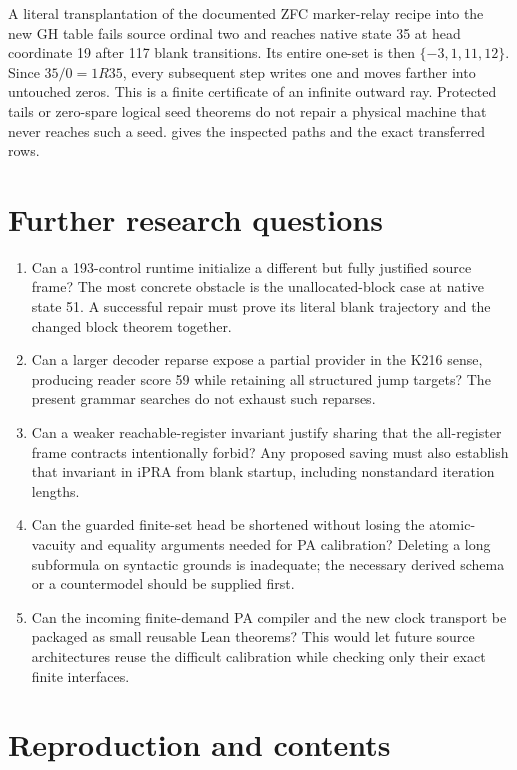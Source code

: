 \documentclass[10pt,letterpaper]{article}
\newcommand{\file}[1]{\texttt{\path{#1}}}
\begin{document}
A literal transplantation of the documented ZFC marker-relay recipe
into the new GH table fails source ordinal two and reaches native state
35 at head coordinate 19 after 117 blank transitions. Its entire one-set
is then $\{-3,1,11,12\}$. Since $35/0=1R35$, every subsequent step
writes one and moves farther into untouched zeros. This is a finite
certificate of an infinite outward ray. Protected tails or zero-spare
logical seed theorems do not repair a physical machine that never reaches
such a seed. \file{research/physical/ZFC_TRANSFER.md} gives the inspected
paths and the exact transferred rows.



\section{Further research questions}

\begin{enumerate}
\item Can a 193-control runtime initialize a different but fully justified
source frame? The most concrete obstacle is the unallocated-block case
at native state 51. A successful repair must prove its literal blank
trajectory and the changed block theorem together.
\item Can a larger decoder reparse expose a partial provider in the K216
sense, producing reader score 59 while retaining all structured jump
targets? The present grammar searches do not exhaust such reparses.
\item Can a weaker reachable-register invariant justify sharing that the
all-register frame contracts intentionally forbid? Any proposed saving
must also establish that invariant in iPRA from blank startup, including
nonstandard iteration lengths.
\item Can the guarded finite-set head be shortened without losing the
atomic-vacuity and equality arguments needed for PA calibration? Deleting
a long subformula on syntactic grounds is inadequate; the necessary
derived schema or a countermodel should be supplied first.
\item Can the incoming finite-demand PA compiler and the new clock
transport be packaged as small reusable Lean theorems? This would let
future source architectures reuse the difficult calibration while
checking only their exact finite interfaces.
\end{enumerate}

\section{Reproduction and contents}
\end{document}

